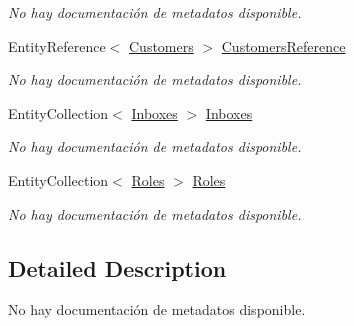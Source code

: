 \begin{DoxyCompactItemize}
\begin{DoxyCompactList}\small\item\em No hay documentación de metadatos disponible. \end{DoxyCompactList}\item 
Entity\-Reference$<$ \hyperlink{class_game_memory_1_1_customers}{Customers} $>$ \hyperlink{class_game_memory_1_1_users_ade92ef696dff98620ce322dedfcd7b52}{Customers\-Reference}
\begin{DoxyCompactList}\small\item\em No hay documentación de metadatos disponible. \end{DoxyCompactList}\item 
Entity\-Collection$<$ \hyperlink{class_game_memory_1_1_inboxes}{Inboxes} $>$ \hyperlink{class_game_memory_1_1_users_a612925fd6d50f8624a9067e930bcbe37}{Inboxes}
\begin{DoxyCompactList}\small\item\em No hay documentación de metadatos disponible. \end{DoxyCompactList}\item 
Entity\-Collection$<$ \hyperlink{class_game_memory_1_1_roles}{Roles} $>$ \hyperlink{class_game_memory_1_1_users_a1dea6fa0cc9c30a97d4090a9523a1d72}{Roles}
\begin{DoxyCompactList}\small\item\em No hay documentación de metadatos disponible. \end{DoxyCompactList}\end{DoxyCompactItemize}


\subsection{Detailed Description}
No hay documentación de metadatos disponible. 



